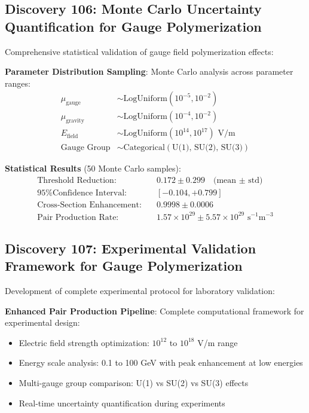 \documentclass[11pt]{article}
\begin{document}
\subsection{Discovery 106: Monte Carlo Uncertainty Quantification for Gauge Polymerization}

Comprehensive statistical validation of gauge field polymerization effects:

\textbf{Parameter Distribution Sampling}:
Monte Carlo analysis across parameter ranges:
\begin{align}
\mu_{\text{gauge}} &\sim \text{LogUniform}(10^{-5}, 10^{-2}) \\
\mu_{\text{gravity}} &\sim \text{LogUniform}(10^{-4}, 10^{-2}) \\
E_{\text{field}} &\sim \text{LogUniform}(10^{14}, 10^{17}) \text{ V/m} \\
\text{Gauge Group} &\sim \text{Categorical}(\text{U(1), SU(2), SU(3)})
\end{align}

\textbf{Statistical Results} (50 Monte Carlo samples):
\begin{align}
\text{Threshold Reduction:} \quad &0.172 \pm 0.299 \quad \text{(mean ± std)} \\
\text{95\% Confidence Interval:} \quad &[-0.104, +0.799] \\
\text{Cross-Section Enhancement:} \quad &0.9998 \pm 0.0006 \\
\text{Pair Production Rate:} \quad &1.57 \times 10^{29} \pm 5.57 \times 10^{29} \text{ s}^{-1}\text{m}^{-3}
\end{align}

\subsection{Discovery 107: Experimental Validation Framework for Gauge Polymerization}

Development of complete experimental protocol for laboratory validation:

\textbf{Enhanced Pair Production Pipeline}:
Complete computational framework for experimental design:
\begin{itemize}
\item Electric field strength optimization: $10^{12}$ to $10^{18}$ V/m range
\item Energy scale analysis: 0.1 to 100 GeV with peak enhancement at low energies
\item Multi-gauge group comparison: U(1) vs SU(2) vs SU(3) effects
\item Real-time uncertainty quantification during experiments
\end{itemize}
\end{document}
